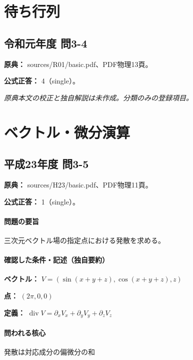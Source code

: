 \section{待ち行列}

\subsection{令和元年度 問3-4}
\label{q:r01-reg-basic-3-4}

\noindent\textbf{原典：} sources/R01/basic.pdf、PDF物理13頁。

\textbf{公式正答：} 4（single）。

\par\textit{原典本文の校正と独自解説は未作成。分類のみの登録項目。}

\section{ベクトル・微分演算}

\subsection{平成23年度 問3-5}
\label{q:h23-reg-basic-3-5}

\noindent\textbf{原典：} sources/H23/basic.pdf、PDF物理11頁。

\textbf{公式正答：} 1（single）。

\paragraph{問題の要旨} 三次元ベクトル場の指定点における発散を求める。

\paragraph{確認した条件・記述（独自要約）}\mbox{}\par

\noindent\textbf{ベクトル：} \(V=(\sin(x+y+z),\cos(x+y+z),z)\)\par

\noindent\textbf{点：} \((2\pi,0,0)\)\par

\noindent\textbf{定義：} \(\operatorname{div}V=\partial_xV_x+\partial_yV_y+\partial_zV_z\)\par

\paragraph{問われる核心} 発散は対応成分の偏微分の和

